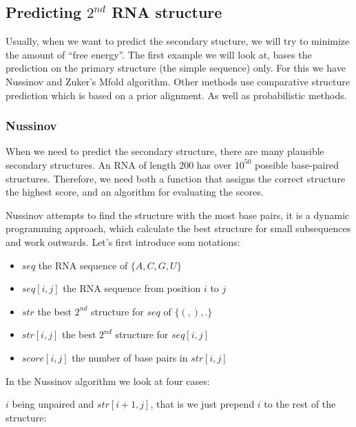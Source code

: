     \subsection{Predicting $2^{nd}$ RNA structure}
    Usually, when we want to predict the secondary stucture, we will try to 
    minimize the amount of ``free energy''. The first example we will look at, 
    bases the prediction on the primary structure (the simple sequence) only. 
    For this we have Nussinov and Zuker's Mfold algorithm. Other methods use 
    comparative structure prediction which is based on a prior alignment. As 
    well as probabilistic methods.
    
    \subsubsection{Nussinov}
    When we need to predict the secondary structure, there are many plausible 
    secondary structures. An RNA of length $200$ has over $10^{50}$ possible 
    base-paired structures. Therefore, we need both a function that assigns the 
    correct structure the highest score, and an algorithm for evaluating the 
    scores.
    
    Nussinov attempts to find the structure with the most base pairs, it is a 
    dynamic programming approach, which calculate the best structure for small 
    subsequences and work outwards. Let's first introduce som notations:
    \begin{itemize}
        \item $seq$ the RNA sequence of $\{A,C,G,U\}$
        \item $seq[i,j]$ the RNA sequence from position $i$ to $j$
        \item $str$ the best $2^{nd}$ structure for $seq$ of $\{(,),.\}$
        \item $str[i,j]$ the best $2^{nd}$ structure for $seq[i,j]$
        \item $score[i,j]$ the number of base pairs in $str[i,j]$
    \end{itemize}
    In the Nussinov algorithm we look at four cases:
    
    $i$ being unpaired and $str[i+1,j]$, that is we just prepend $i$ to the 
    rest of the structure:
    
    
